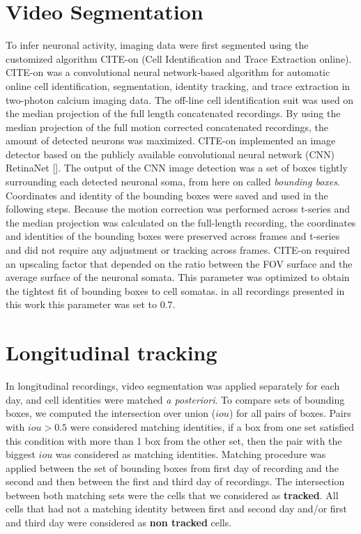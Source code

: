 \section{Video Segmentation}
\label{chap3:sec:4:segmentation}
To infer neuronal activity, imaging data were first segmented using the customized algorithm CITE-on (Cell Identification and Trace Extraction online). 
CITE-on was a convolutional neural network-based algorithm for automatic online cell identification, segmentation, identity tracking, and trace extraction in two-photon calcium imaging data. 
The off-line cell identification suit was used on the median projection of the full length concatenated recordings.
By using the median projection of the full motion corrected concatenated recordings, the amount of detected neurons was maximized.
CITE-on implemented an image detector based on the publicly available convolutional neural network (CNN) RetinaNet [\cite{lin2020}].
The output of the CNN image detection was a set of boxes tightly surrounding each detected neuronal soma, from here on called \textit{bounding boxes}.
Coordinates and identity of the bounding boxes were saved and used in the following steps. 
Because the motion correction was performed across t-series and the median projection was calculated on the full-length recording, the coordinates and identities of the bounding boxes were preserved across frames and t-series and did not require any adjustment or tracking across frames. 
CITE-on required an upscaling factor that depended on the ratio between the FOV surface and the average surface of the neuronal somata. 
This parameter was optimized to obtain the tightest fit of bounding boxes to cell somatas. in all recordings presented in this work this parameter was set to $0.7$.  

\section{Longitudinal tracking}
\label{chap3:sec:5:long_tracking}
In longitudinal recordings, video segmentation was applied separately for each day, and cell identities were matched \textit{a posteriori}. 
To compare sets of bounding boxes, we computed the intersection over union ($iou$) for all pairs of boxes. 
Pairs with $iou>0.5$ were considered matching identities, if a box from one set satisfied this condition with more than 1 box from the other set, then the pair with the biggest $iou$ was considered as matching identities. 
Matching procedure was applied between the set of bounding boxes from first day of recording and the second and then between the first and third day of recordings.
The intersection between both matching sets were the cells that we considered as \textbf{tracked}.
All cells that had not a matching identity between first and second day and/or first and third day were considered as \textbf{non tracked} cells. 
